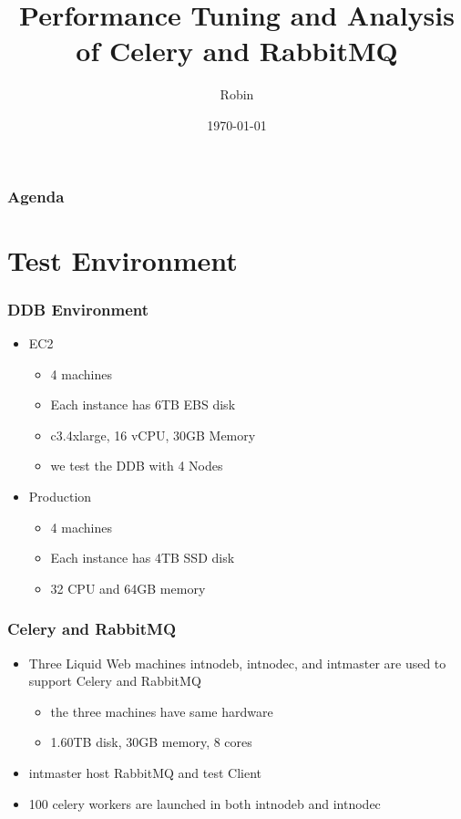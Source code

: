 \documentclass{beamer}
\title[DDB with Celery and RabbitMQ]{Performance Tuning and Analysis of Celery  and RabbitMQ}
\author{Robin}
\date{\today}
\begin{document}
\begin{frame}
\titlepage 
\end{frame}

\begin{frame}
\frametitle{Agenda} 
\tableofcontents 
\end{frame}

\section{Test Environment}
\begin{frame}
\frametitle{DDB Environment}
\begin{itemize}
\item EC2
	\begin{itemize}
	\item 4 machines
	\item Each instance has 6TB EBS disk
	\item c3.4xlarge, 16 vCPU, 30GB Memory
	\item we test the DDB with 4 Nodes
	\end{itemize}
\item Production
	\begin{itemize}
	\item 4 machines
	\item Each instance has 4TB SSD disk
	\item 32 CPU and 64GB memory
	\end{itemize}	
\end{itemize}
\end{frame}

\begin{frame}
\frametitle{Celery and RabbitMQ}
\begin{itemize}
\item Three Liquid Web machines intnodeb, intnodec, and intmaster are used to support Celery and RabbitMQ
	\begin{itemize}
	\item the three machines have same hardware
	\item 1.60TB disk, 30GB memory, 8 cores
	\end{itemize}
\item intmaster host RabbitMQ and test Client
\item 100 celery workers are launched in both intnodeb and intnodec
\end{itemize}
\end{frame}
\end{document}
